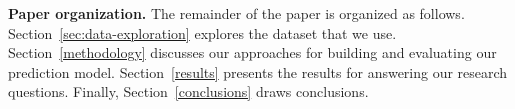 \textbf{Paper organization.}
The remainder of the paper is organized as follows.
Section~\ref{sec:data-exploration} explores the dataset that we use.
Section~\ref{methodology} discusses our approaches for building and evaluating our prediction model. %
Section~\ref{results} presents the results for answering our research questions.
Finally, Section~\ref{conclusions} draws conclusions.

